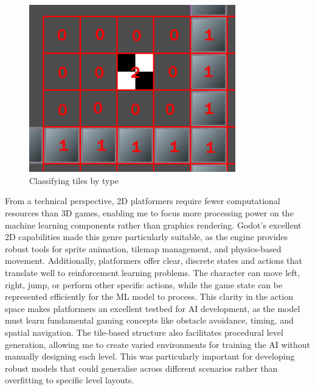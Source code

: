 \begin{figure}[H]
    \centering
    \includegraphics[width=0.8\textwidth]{figures/tilemap.png}
    \caption{Classifying tiles by type}
    \label{fig:tilemap}
\end{figure}

From a technical perspective, 2D platformers require fewer computational resources than 3D games, enabling me to focus more processing power on the machine learning components rather than graphics rendering. 
Godot's excellent 2D capabilities made this genre particularly suitable, as the engine provides robust tools for sprite animation, tilemap management, and physics-based movement.
Additionally, platformers offer clear, discrete states and actions that translate well to reinforcement learning problems. 
The character can move left, right, jump, or perform other specific actions, while the game state can be represented efficiently for the ML model to process.
This clarity in the action space makes platformers an excellent testbed for AI development, as the model must learn fundamental gaming concepts like obstacle avoidance, timing, and spatial navigation.
The tile-based structure also facilitates procedural level generation, allowing me to create varied environments for training the AI without manually designing each level. 
This was particularly important for developing robust models that could generalise across different scenarios rather than overfitting to specific level layouts.

